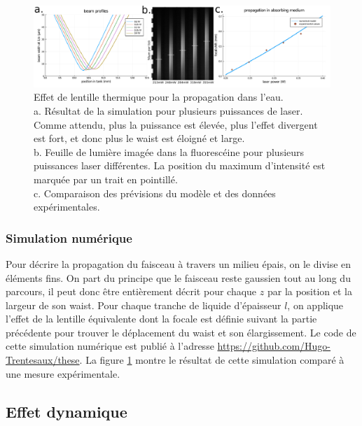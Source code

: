 \begin{figure}
\centering
\includegraphics[width=\textwidth]{./files/thermal_shift_model.svg.png}
\caption{Effet de lentille thermique pour la propagation dans l'eau.
\\a. Résultat de la simulation pour plusieurs puissances de laser. Comme attendu, plus la puissance est élevée, plus l'effet divergent est fort, et donc plus le waist est éloigné et large.
\\b. Feuille de lumière imagée dans la fluorescéine pour plusieurs puissances laser différentes. La position du maximum d'intensité est marquée par un trait en pointillé.
\\c. Comparaison des prévisions du modèle et des données expérimentales.
\label{FIGthermalfluorescine}}
\end{figure}

\subsubsection{Simulation numérique}\label{simulationthermallens}

Pour décrire la propagation du faisceau à travers un milieu épais, on le divise en éléments fins.
On part du principe que le faisceau reste gaussien tout au long du parcours, il peut donc être entièrement décrit pour chaque $z$ par la position et la largeur de son waist. Pour chaque tranche de liquide d'épaisseur $l$, on applique l'effet de la lentille équivalente dont la focale est définie suivant la partie précédente pour trouver le déplacement du waist et son élargissement. Le code de cette simulation numérique est publié à l'adresse \href{https://github.com/Hugo-Trentesaux/these}{https://github.com/Hugo-Trentesaux/these}. La figure \ref{FIGthermalfluorescine} montre le résultat de cette simulation comparé à une mesure expérimentale.



\subsection{Effet dynamique}


